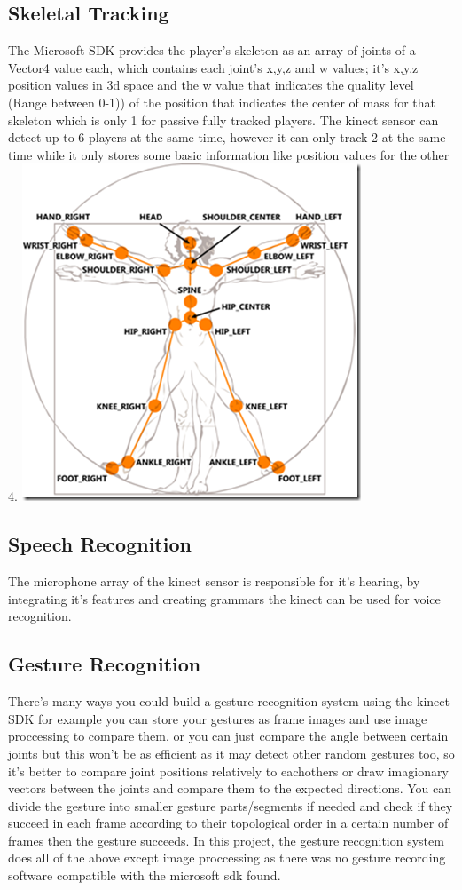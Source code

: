 \subsection{Skeletal Tracking}

The Microsoft SDK provides the player's skeleton as an array of joints of a Vector4 value each, which contains each joint's x,y,z and w values; it's x,y,z position values in 3d space and the w value that indicates  the quality level (Range between 0-1)) of the position that indicates the center of mass for that skeleton which is only 1 for passive fully tracked players. The kinect sensor can detect up to 6 players at the same time, however it can only track 2 at the same time while it only stores some basic information like position values for the other 4.
\includegraphics[scale=2]{SkeletonJoints.png}

\subsection{Speech Recognition}

The microphone array of the kinect sensor is responsible for it's hearing, by integrating it's features and creating grammars the kinect can be used for voice recognition.

\subsection{Gesture Recognition}

There's many ways you could build a gesture recognition system using the kinect SDK for example you can store your gestures as frame images and use image proccessing to compare them, or you can just compare the angle between certain joints but this won't be as efficient as it may detect other random gestures too, so it's better to compare joint positions relatively to eachothers or draw imagionary vectors between the joints and compare them to the expected directions. 
You can divide the gesture into smaller gesture parts/segments if needed and check if they succeed in each frame according to their topological order in a certain number of frames then the gesture succeeds.
In this project, the gesture recognition system does all of the above except image proccessing as there was no gesture recording software compatible with the microsoft sdk found.

